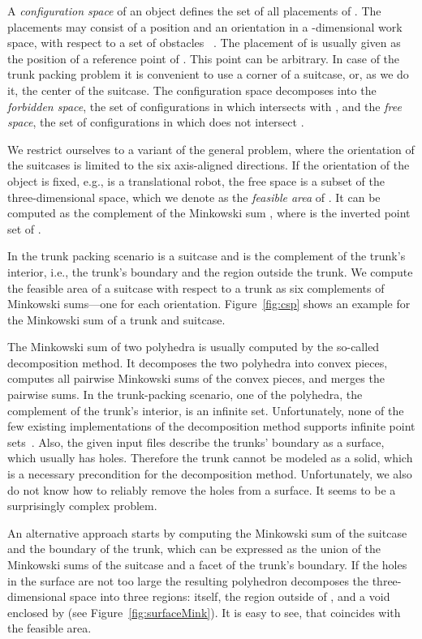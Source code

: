 \documentclass{article}
\begin{document}
A \emph{configuration space} of an object  defines the set of all
placements of . The placements may consist of a position and an
orientation in a -dimensional work space, with respect to a set of
obstacles ~\cite{bkos-cgaa-97}. The placement of  is usually
given as the position of a reference point of . This point can be
arbitrary.  In case of the trunk packing problem it is convenient to
use a corner of a suitcase, or, as we do it, the center of the
suitcase. The configuration space decomposes into the \emph{forbidden
space}, the set of configurations in which  intersects with ,
and the \emph{free space}, the set of configurations in which  does
not intersect .

We restrict ourselves to a variant of the general problem, where the
orientation of the suitcases is limited to the six axis-aligned
directions. If the orientation of the object  is fixed, e.g.,  is
a translational robot, the free space is a subset of the
three-dimensional space, which we denote as the \emph{feasible area}
of . It can be computed as the complement of the Minkowski sum
, where  is
the inverted point set of . 

In the trunk packing scenario  is a suitcase and  is the
complement of the trunk's interior, i.e., the trunk's boundary and the
region outside the trunk. We compute the feasible area of a suitcase
with respect to a trunk as six complements of Minkowski sums---one for
each orientation. Figure~\ref{fig:csp} shows an example for the
Minkowski sum of a trunk and suitcase.

The Minkowski sum of two polyhedra is usually computed by the
so-called decomposition method. It decomposes the two polyhedra into
convex pieces, computes all pairwise Minkowski sums of the convex
pieces, and merges the pairwise sums. In the trunk-packing scenario,
one of the polyhedra, the complement of the trunk's interior, is an
infinite set. Unfortunately, none of the few existing implementations
of the decomposition method supports infinite point
sets~\cite{h-emspe-07,vm-amsap-04}. Also, the given input files
describe the trunks' boundary as a surface, which usually has
holes. Therefore the trunk cannot be modeled as a solid, which is a
necessary precondition for the decomposition method. Unfortunately, we
also do not know how to reliably remove the holes from a surface. It
seems to be a surprisingly complex problem.

An alternative approach starts by computing the Minkowski sum of the
suitcase and the boundary of the trunk, which can be expressed as the
union of the Minkowski sums of the suitcase and a facet of the trunk's
boundary. If the holes in the surface are not too large the resulting
polyhedron  decomposes the three-dimensional space into three
regions:  itself, the region  outside of , and a void 
enclosed by  (see Figure~\ref{fig:surfaceMink}). It is easy to see,
that  coincides with the feasible area.
\end{document}
